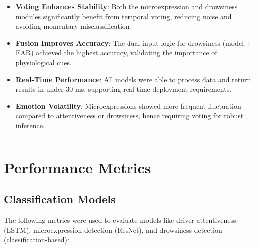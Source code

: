\documentclass[
  letterpaper,
  DIV=11,
  numbers=noendperiod]{scrreport}
\providecommand{\tightlist}{%
  \setlength{\itemsep}{0pt}\setlength{\parskip}{0pt}}
\begin{document}
\begin{itemize}
\tightlist
\item
  \textbf{Voting Enhances Stability}: Both the microexpression and
  drowsiness modules significantly benefit from temporal voting,
  reducing noise and avoiding momentary misclassification.
\item
  \textbf{Fusion Improves Accuracy}: The dual-input logic for drowsiness
  (model + EAR) achieved the highest accuracy, validating the importance
  of physiological cues.
\item
  \textbf{Real-Time Performance}: All models were able to process data
  and return results in under 30 ms, supporting real-time deployment
  requirements.
\item
  \textbf{Emotion Volatility}: Microexpressions showed more frequent
  fluctuation compared to attentiveness or drowsiness, hence requiring
  voting for robust inference.
\end{itemize}

\begin{center}\rule{0.5\linewidth}{0.5pt}\end{center}

\section{Performance Metrics}\label{performance-metrics}

\subsection{Classification Models}\label{classification-models}

The following metrics were used to evaluate models like driver
attentiveness (LSTM), microexpression detection (ResNet), and drowsiness
detection (classification-based):
\end{document}
